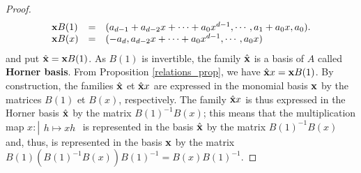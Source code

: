 \documentclass{standalone}
\begin{document}
\begin{rem}
\begin{proof}
\begin{equation}
	\begin{array}{lll}
		\bold{x}B(1) & = & (a_{d-1} + a_{d-2}x + \cdots + a_0x^{d-1}, \cdots, a_1 + a_0x,  a_0).\\
		\bold{x}B(x) & = & (-a_d, a_{d-2}x + \cdots + a_0x^{d-1}, \cdots, a_0x)
	\end{array}
\end{equation}
and put $\hat{\bold{x}} = \bold{x}B(1)$.
As $B(1)$ is invertible, the family $\hat{\bold{x}}$ is a basis of $A$ called {\bf Horner basis}.
From Proposition \ref{relations_prop}, we have $\hat{\bold{x}}x = \bold{x}B(1)$. By construction, the families $\hat{\bold{x}}$ et $\hat{\bold{x}}x$ are expressed in the monomial basis $\bold{x}$ by the matrices $B(1)$ et $B(x)$, respectively.
The family $\hat{\bold{x}}x$ is thus expressed in the Horner basis $\hat{\bold{x}}$ by the matrix $B(1)^{-1}B(x)$; this means that the multiplication map
$x : \left\vert
\begin{array}{c}
h \mapsto xh
\end{array}
\right.$ is represented in the basis $\hat{\bold{x}}$ by the matrix $B(1)^{-1}B(x)$
and, thus, is represented in the basis $\bold{x}$ by the matrix $B(1)(B(1)^{-1}B(x))B(1)^{-1} = B(x)B(1)^{-1}$.
\end{proof}




\end{rem}
\end{document}

